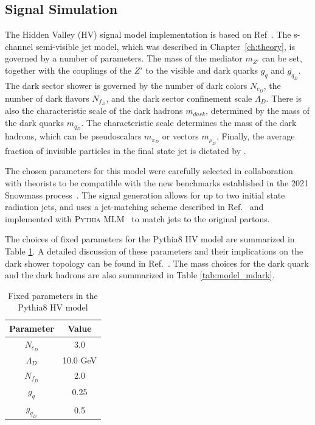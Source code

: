 \subsection{Signal Simulation}
\label{subsec:signals}

The Hidden Valley (HV) signal model implementation is based on Ref~\cite{darkqcd}. 
The s-channel semi-visible jet model, which was described in Chapter~\ref{ch:theory}, is governed by a number of parameters. 
The mass of the mediator $m_{Z'}$ can be set, together with the couplings of the $Z'$ to the visible and dark quarks $g_q$ and $g_{q_D}$. 
The dark sector shower is governed by the number of dark colors $N_{c_D}$, the number of dark flavors $N_{f_D}$, and the dark sector confinement scale $\Lambda_D$. 
There is also the characteristic scale of the dark hadrons $m_{dark}$, determined by the mass of the dark quarks $m_{q_D}$. 
The characteristic scale determines the mass of the dark hadrons, which can be pseudoscalars $m_{\pi_D}$ or vectors $m_{\rho_D}$.
Finally, the average fraction of invisible particles in the final state jet is dictated by \rinv. 

The chosen parameters for this model were carefully selected in collaboration with theorists to be compatible with the new benchmarks established in the 2021 Snowmass process~\cite{snowmass}. 
The signal generation allows for up to two initial state radiation jets, and uses a jet-matching scheme described in Ref.~\cite{mlm} and implemented with \textsc{Pythia MLM}~\cite{pythia} to match jets to the original partons.

The choices of fixed parameters for the Pythia8 HV model are summarized in Table \ref{tab:model_fixed_params}.
A detailed discussion of these parameters and their implications on the dark shower topology can be found in Ref.~\cite{snowmass}. 
The mass choices for the dark quark and the dark hadrons are also summarized in Table \ref{tab:model_mdark}. 

\begin{table}
\centering
  \begin{tabular}{ |c|c| }
    \hline
    Parameter & Value \\
    \hline
     $N_{c_D}$ & 3.0 \\
     $\Lambda_D$ & 10.0 GeV\\
     $N_{f_D}$ & 2.0\\
     $g_q$ & 0.25\\
     $g_{q_D}$ & 0.5\\
    \hline
  \end{tabular}
  \caption{Fixed parameters in the Pythia8 HV model}
  \label{tab:model_fixed_params}
\end{table}

